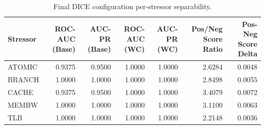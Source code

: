 \begin{table}[t]
\centering
\caption{Final DICE configuration per-stressor separability.}
\label{tab:dice_full_stressor}
\footnotesize
\begin{tabular}{lrrrrrr}
\toprule
Stressor & ROC-AUC (Base) & AUC-PR (Base) & ROC-AUC (WC) & AUC-PR (WC) & Pos/Neg Score Ratio & Pos-Neg Score Delta \\
\midrule
ATOMIC & 0.9375 & 0.9500 & 1.0000 & 1.0000 & 2.6284 & 0.0048 \\
BRANCH & 1.0000 & 1.0000 & 1.0000 & 1.0000 & 2.8498 & 0.0055 \\
CACHE & 0.9375 & 0.9500 & 1.0000 & 1.0000 & 3.4079 & 0.0072 \\
MEMBW & 1.0000 & 1.0000 & 1.0000 & 1.0000 & 3.1100 & 0.0063 \\
TLB & 1.0000 & 1.0000 & 1.0000 & 1.0000 & 2.2148 & 0.0036 \\
\bottomrule
\end{tabular}

\end{table}
